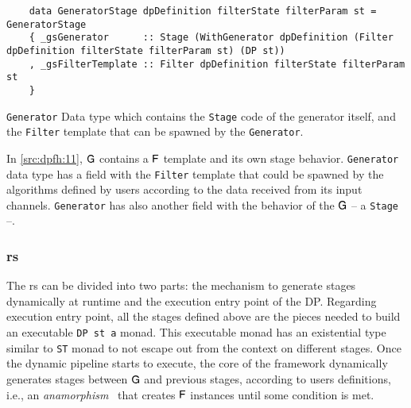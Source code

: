 \begin{listing}[h!]
 \scriptsize{
  \begin{verbatim}
    data GeneratorStage dpDefinition filterState filterParam st = GeneratorStage
    { _gsGenerator      :: Stage (WithGenerator dpDefinition (Filter dpDefinition filterState filterParam st) (DP st))
    , _gsFilterTemplate :: Filter dpDefinition filterState filterParam st
    }  
  \end{verbatim}
  }
  \caption[{[\texttt{Stage.hs}] Generator}]{\texttt{Generator} Data type which contains the \texttt{Stage} code of the generator itself, and the \texttt{Filter} template that can be spawned by the \texttt{Generator}.}
  \label{src:dpfh:11}
\end{listing}

In \autoref{src:dpfh:11}, $\mathsf{G}$ contains a $\mathsf{F}$ template and its own stage behavior.
\texttt{Generator} data type has a field with the \texttt{Filter} template that could be spawned by the algorithms defined by users according to the data received from its input channels.
\texttt{Generator} has also another field with the behavior of the $\mathsf{G}$ -- a \texttt{Stage} --. 

\subsubsection{\texorpdfstring{\acrfull{rs}}{Lg}}
The \acrshort{rs} can be divided into two parts: the mechanism to generate stages dynamically at runtime  and the execution entry point of the DP.
Regarding execution entry point, all the stages defined above are the pieces needed to build an executable \texttt{DP st a} monad.
This executable monad has an existential type similar to \texttt{ST} monad to not escape out from the context on different stages.
Once the dynamic pipeline starts to execute, the core of the framework dynamically generates stages between $\mathsf{G}$ and previous stages, according to users definitions, i.e., an \emph{anamorphism}~\cite{lenses} that creates $\mathsf{F}$ instances until some condition is met.

